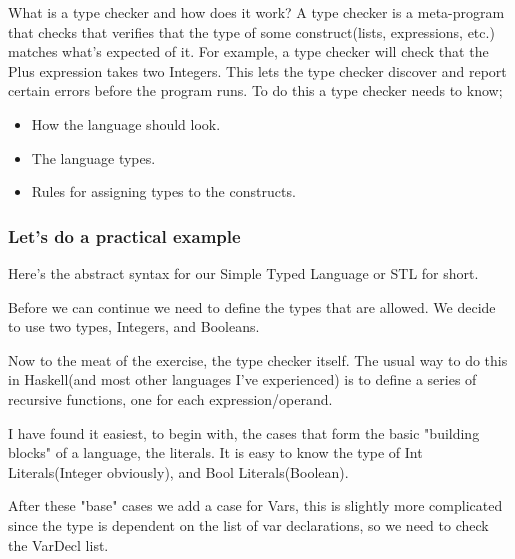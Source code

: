         What is a type checker and how does it work? 
        A type checker is a meta-program that checks that verifies that the type of some construct(lists, expressions, etc.) matches what's expected of it.
        For example, a type checker will check that the Plus \gls{expression} takes two Integers. 
        \newpage
        This lets the type checker discover and report certain errors before the program runs. 
        To do this a type checker needs to know;
        \begin{itemize}
            \item How the language should look.
            \item The language types.
            \item Rules for assigning types to the constructs.
        \end{itemize}
        \subsubsection*{Let's do a practical example}
        Here's the abstract syntax for our Simple Typed Language or STL for short.
        
        Before we can continue we need to define the types that are allowed. We decide to use two types, Integers, and Booleans.
        
        
        Now to the meat of the exercise, the type checker itself.
        The usual way to do this in Haskell(and most other languages I've experienced) is to define a series of recursive functions, one for each
        expression/operand.
        
        
        I have found it easiest, to begin with, the cases that form the basic "building blocks" of a language, the literals. It is easy to know the type of Int Literals(Integer obviously), and Bool Literals(Boolean).
        
        
        After these "base" cases we add a case for Vars, this is slightly more complicated since the type is dependent on the list of var declarations, 
        so we need to check the VarDecl list.
        
        
